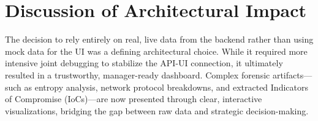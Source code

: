 \section{Discussion of Architectural Impact}
The decision to rely entirely on real, live data from the backend rather than using mock data for the UI was a defining architectural choice. While it required more intensive joint debugging to stabilize the API-UI connection, it ultimately resulted in a trustworthy, manager-ready dashboard. Complex forensic artifacts---such as entropy analysis, network protocol breakdowns, and extracted Indicators of Compromise (IoCs)---are now presented through clear, interactive visualizations, bridging the gap between raw data and strategic decision-making.
